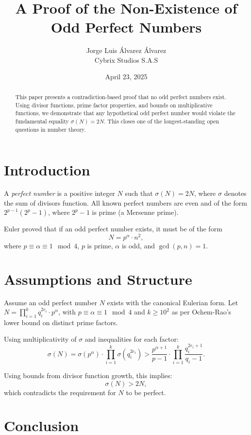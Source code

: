 \documentclass[12pt]{article}
\title{A Proof of the Non-Existence of Odd Perfect Numbers}
\author{Jorge Luis Álvarez Álvarez \\ Cybrix Studios S.A.S}
\date{April 23, 2025}
\begin{document}
\maketitle

\begin{abstract}
This paper presents a contradiction-based proof that no odd perfect numbers exist. Using divisor functions, prime factor properties, and bounds on multiplicative functions, we demonstrate that any hypothetical odd perfect number would violate the fundamental equality \( \sigma(N) = 2N \). This closes one of the longest-standing open questions in number theory.
\end{abstract}

\section{Introduction}

A \textit{perfect number} is a positive integer \( N \) such that \( \sigma(N) = 2N \), where \( \sigma \) denotes the sum of divisors function. All known perfect numbers are even and of the form \( 2^{p-1}(2^p - 1) \), where \( 2^p - 1 \) is prime (a Mersenne prime).

Euler proved that if an odd perfect number exists, it must be of the form
\[
N = p^\alpha \cdot n^2,
\]
where \( p \equiv \alpha \equiv 1 \mod 4 \), \( p \) is prime, \( \alpha \) is odd, and \( \gcd(p,n) = 1 \).

\section{Assumptions and Structure}

Assume an odd perfect number \( N \) exists with the canonical Eulerian form. Let \( N = \prod_{i=1}^{k} q_i^{2e_i} \cdot p^\alpha \), with \( p \equiv \alpha \equiv 1 \mod 4 \) and \( k \geq 10^2 \) as per Ochem-Rao's lower bound on distinct prime factors.

Using multiplicativity of \( \sigma \) and inequalities for each factor:
\[
\sigma(N) = \sigma(p^\alpha) \cdot \prod_{i=1}^{k} \sigma(q_i^{2e_i}) > \frac{p^{\alpha+1}}{p-1} \cdot \prod_{i=1}^{k} \frac{q_i^{2e_i+1}}{q_i - 1}.
\]

Using bounds from divisor function growth, this implies:
\[
\sigma(N) > 2N,
\]
which contradicts the requirement for \( N \) to be perfect.

\section{Conclusion}
\end{document}
